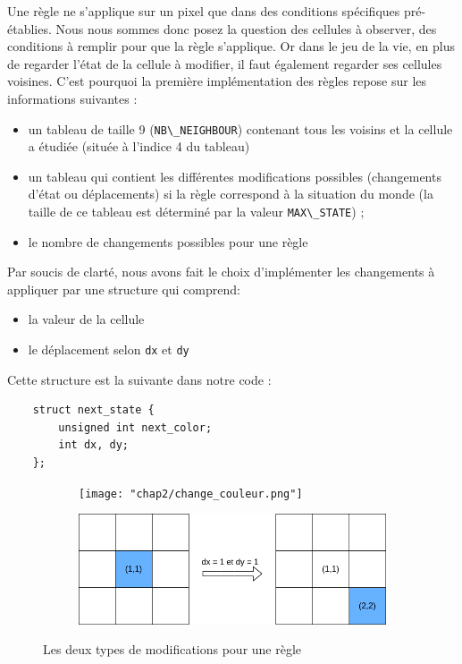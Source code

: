 Une règle ne s'applique sur un pixel que dans des conditions spécifiques pré-établies. Nous nous sommes donc posez la question des cellules à observer, des conditions à remplir pour que la règle s'applique. Or dans le jeu de la vie, en plus de regarder l'état de la cellule à modifier, il faut également regarder ses cellules voisines. C'est pourquoi la première  implémentation des règles repose sur les informations suivantes :
\begin{itemize}
    \item un tableau de taille 9 (\lstinline{NB\_NEIGHBOUR}) contenant tous les voisins et la cellule a étudiée (située à l'indice 4 du tableau)
    \item un tableau qui contient les différentes modifications possibles (changements d'état ou déplacements) si la règle correspond à la situation du monde (la taille de ce tableau est déterminé par la valeur \lstinline{MAX\_STATE}) ;
    \item le nombre de changements possibles pour une règle
\end{itemize}
\vspace{\parskip}

Par soucis de clarté, nous avons fait le choix d'implémenter les changements à appliquer par une structure qui comprend:
\begin{itemize}
    \item la valeur de la cellule
    \item le déplacement selon \texttt{dx} et \texttt{dy}
\end{itemize}

Cette structure est la suivante dans notre code :
\begin{lstlisting}
    struct next_state {
        unsigned int next_color;
        int dx, dy;
    };
\end{lstlisting}
\vspace{\parskip}

\begin{figure}[h!]
    \centering
    \begin{subfigure}{0.75\textwidth}
        \texttt{[image: "chap2/change\_couleur.png"]}
        \label{fig:chgt_color}
        \bigskip
    \end{subfigure}

    \begin{subfigure}{0.75\textwidth}
        \includegraphics[width=\textwidth]{img/chap2/change_mov.png}
        \label{fig:chgt_move}
    \end{subfigure}
    \caption{Les deux types de modifications pour une règle}
    \label{fig:modif_types}
\end{figure}

